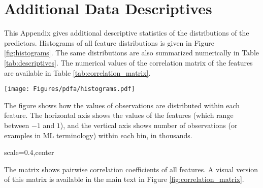 \chapter{Additional Data Descriptives}
\label{chap:additional_figures} 

This Appendix gives additional descriptive statistics of the distributions of the predictors. Histograms of all feature distributions is given in Figure \ref{fig:histograms}. The same distributions are also summarized numerically in Table \ref{tab:descriptives}. The numerical values of the correlation matrix of the features are available in Table \ref{tab:correlation_matrix}.
 
\begin{center}
	\begin{sidewaysfigure}
		\texttt{[image: Figures/pdfa/histograms.pdf]}
		\caption{Histograms of All Features}
		\label{fig:histograms}
		\medskip
		\small
		The figure shows how the values of observations are distributed within each feature. The horizontal axis shows the values of the features (which range between $-1$ and $1$), and the vertical axis shows number of observations (or examples in ML terminology) within each bin, in thousands.  
	\end{sidewaysfigure}
\end{center}  
 
\begin{table}
	\resizebox{\textwidth}{!}{}
	\caption{Descriptive Statistics of the Features}
	\label{tab:descriptives}
\end{table} 
 
\begin{sidewaystable}
	\begin{adjustbox}{scale=0.4,center}
		
	\end{adjustbox}
	\caption{Features Correlation Matrix}
	\label{tab:correlation_matrix}
	\medspace
	\small
	The matrix shows pairwise correlation coefficients of all features. A visual version of this matrix is available in the main text in Figure \ref{fig:correlation_matrix}.
\end{sidewaystable}



